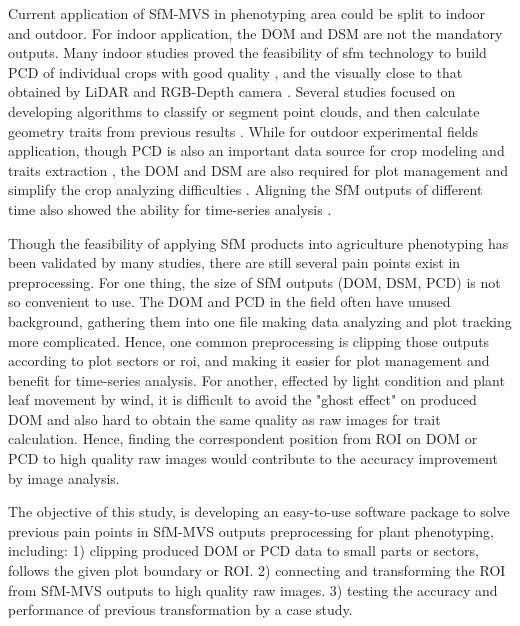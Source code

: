 \documentclass{configs/bmcart}
\begin{document}
Current application of SfM-MVS in phenotyping area could be split to indoor and outdoor. For indoor application, the DOM and DSM are not the mandatory outputs. Many indoor studies proved the feasibility of \acrshort*{sfm} technology to build PCD of individual crops with good quality \cite{wang_maize_2019, rossi_performances_2020}, and the visually close to that obtained by LiDAR \cite{thapa_novel_2018} and RGB-Depth camera \cite{martinez-guanter_low-cost_2019}. Several studies focused on developing algorithms to classify or segment point clouds, and then calculate geometry traits from previous results \cite{ziamtsov_machine_2019, artzet_phenomenal_2019}. While for outdoor experimental fields application, though PCD is also an important data source for crop modeling and traits extraction \cite{jay_field_2015, sun_three-dimensional_2020, zhu_quantification_2020}, the DOM and DSM are also required for plot management and simplify the crop analyzing difficulties \cite{sun_field_2018, tresch_easympe_2019, chen_grid_2020}. Aligning the SfM outputs of different time also showed the ability for time-series analysis \cite{dong_4d_2017, han_clustering_2018}.

Though the feasibility of applying SfM products into agriculture phenotyping has been validated by many studies, there are still several pain points exist in preprocessing. For one thing, the size of SfM outputs (DOM, DSM, PCD) is not so convenient to use. The DOM and PCD in the field often have unused background, gathering them into one file making data analyzing and plot tracking more complicated. Hence, one common preprocessing is clipping those outputs according to plot sectors or \acrfull*{roi}, and making it easier for plot management and benefit for time-series analysis. For another, effected by light condition and plant leaf movement by wind, it is difficult to avoid the "ghost effect" on produced DOM and also hard to obtain the same quality as raw images for trait calculation. Hence, finding the correspondent position from ROI on DOM or PCD to high quality raw images would contribute to the accuracy improvement by image analysis.

The objective of this study, is developing an easy-to-use software package to solve previous pain points in SfM-MVS outputs preprocessing for plant phenotyping, including: 1) clipping produced DOM or PCD data to small parts or sectors, follows the given plot boundary or ROI. 2) connecting and transforming the ROI from SfM-MVS outputs to high quality raw images. 3) testing the accuracy and performance of previous transformation by a case study.
\end{document}
